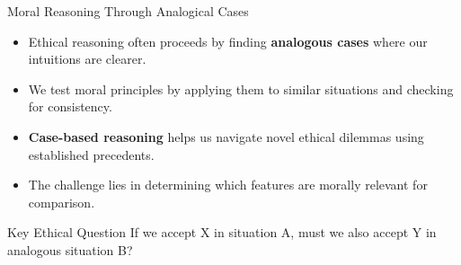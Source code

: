 \documentclass{beamer}
\begin{document}
	\begin{frame}{Moral Reasoning Through Analogical Cases}
		\begin{itemize}
			\item Ethical reasoning often proceeds by finding \textbf{analogous cases} where our intuitions are clearer.
			\item We test moral principles by applying them to similar situations and checking for consistency.
			\item \textbf{Case-based reasoning} helps us navigate novel ethical dilemmas using established precedents.
			\item The challenge lies in determining which features are morally relevant for comparison.
		\end{itemize}
		
		\begin{alertblock}{Key Ethical Question}
			If we accept X in situation A, must we also accept Y in analogous situation B?
		\end{alertblock}
	\end{frame}
	
\end{document}
